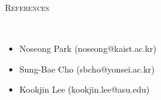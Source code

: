 \documentclass[10pt]{article}
\newenvironment{changemargin}[2]{
  \begin{list}{}{
    \setlength{\topsep}{0pt}
    \setlength{\leftmargin}{#1}
    \setlength{\rightmargin}{#2}
    \setlength{\listparindent}{\parindent}
    \setlength{\itemindent}{\parindent}
    \setlength{\parsep}{\parskip}
  }
  \item[]}{\end{list}
}
\newcommand{\lineover}{
	\begin{changemargin}{-0.05in}{-0.05in}
		\vspace*{-8pt}
		\hrulefill \\
		\vspace*{-2pt}
	\end{changemargin}
}
\newcommand{\header}[1]{
	\begin{changemargin}{-0.5in}{-0.5in}
		\scshape{#1}\\
  	\lineover
	\end{changemargin}
}
\newenvironment{body} {
	\vspace*{-16pt}
	\begin{changemargin}{-0.25in}{-0.5in}
  }
	{\end{changemargin}
}
\begin{document}
\medskip

\header{References}

\begin{body}
	\vspace{14pt}
    \begin{itemize}
        \item Noseong Park  (noseong@kaist.ac.kr)
        \item Sung-Bae Cho  (sbcho@yonsei.ac.kr)
        \item Kookjin Lee  (kookjin.lee@asu.edu)
    \end{itemize}
\end{body}


\medskip
\end{document}
